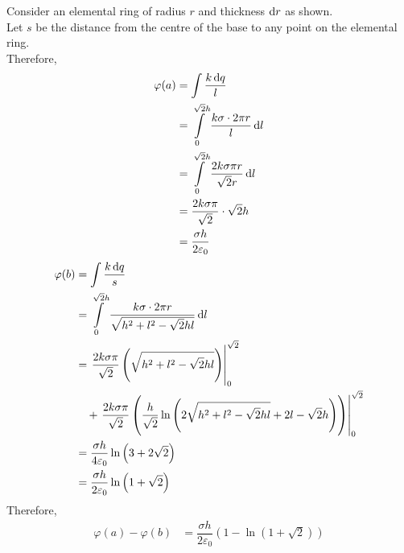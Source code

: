 \documentclass[fleqn, a4paper, 12pt, oneside]{amsart}
\theoremstyle{definition}
\theoremstyle{theorem}
\begin{document}
\begin{solution}
\begin{figure}[H]
	\end{figure}
	Consider an elemental ring of radius $r$ and thickness $\dif r$ as shown.\\
	Let $s$ be the distance from the centre of the base to any point on the elemental ring.\\
	Therefore,
	\begin{align*}
		\varphi(a) &= \int \dfrac{k \dif q}{l}\\
		&= \int\limits_{0}^{\sqrt{2} h} \dfrac{k \sigma \cdot 2 \pi r}{l} \dif l\\
		&= \int\limits_{0}^{\sqrt{2} h} \dfrac{2 k \sigma \pi r}{\sqrt{2} r} \dif l\\
		&= \dfrac{2 k \sigma \pi}{\sqrt{2}} \cdot \sqrt{2} h\\
		&= \dfrac{\sigma h}{2 \varepsilon_0}
	\end{align*}
	\begin{align*}
		\varphi(b) &= \int \dfrac{k \dif q}{s}\\
		&= \int\limits_{0}^{\sqrt{2} h} \dfrac{k \sigma \cdot 2 \pi r}{\sqrt{h^2 + l^2 - \sqrt{2} h l}} \dif l\\
		&= \left. \dfrac{2 k \sigma \pi}{\sqrt{2}} \left( \sqrt{h^2 + l^2 - \sqrt{2} h l} \right) \right|_{0}^{\sqrt{2}}\\
		&\quad + \left. \dfrac{2 k \sigma \pi}{\sqrt{2}} \left( \dfrac{h}{\sqrt{2}} \ln \left( 2 \sqrt{h^2 + l^2 - \sqrt{2} h l} + 2 l - \sqrt{2} h \right) \right) \right|_{0}^{\sqrt{2}} \\
		&= \dfrac{\sigma h}{4 \varepsilon_0} \ln \left( 3 + 2 \sqrt{2} \right)\\
		&= \dfrac{\sigma h}{2 \varepsilon_0} \ln \left( 1 + \sqrt{2} \right)
	\end{align*}
	Therefore,
	\begin{align*}
		\varphi(a) - \varphi(b) &= \dfrac{\sigma h}{2 \varepsilon_0} \left( 1 - \ln \left( 1 + \sqrt{2} \right) \right)
	\end{align*}
\end{solution}
\end{document}
